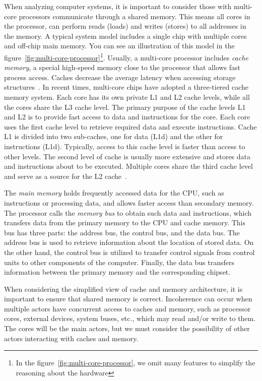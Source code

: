 When analyzing computer systems, it is important to consider those with multi-core processors communicate through a shared memory. This means all cores in the processor, can perform reads (loads) and writes (stores) to all addresses in the memory. A typical system model includes a single chip with multiple cores and off-chip main memory. You can see an illustration of this model in the figure~\ref{fig:multi-core-processor}\footnote{In the figure~\ref{fig:multi-core-processor}, we omit many features to simplify the reasoning about the hardware}. Usually, a multi-core processor includes \emph{cache memory}, a special high-speed memory close to the processor that allows fast process access. Caches decrease the average latency when accessing storage structures~\cite{DBLP_series_synthesis_2020Nagarajan, DBLP_series_synthesis_2013Scott}. In recent times, multi-core chips have adopted a three-tiered cache memory system. Each core has its own private L1 and L2 cache levels, while all the cores share the L3 cache level. The primary purpose of the cache levels L1 and L2 is to provide fast access to data and instructions for the core. Each core uses the first cache level to retrieve required data and execute instructions. Cache L1 is divided into two sub-caches, one for data (L1d) and the other for instructions (L1d). Typically, access to this cache level is faster than access to other levels. The second level of cache is usually more extensive and stores data and instructions about to be executed.
Multiple cores share the third cache level and serve as a source for the L2 cache~\cite{devices_amd64,guideintel}.


The \emph{main memory} holds frequently accessed data for the CPU, such as instructions or processing data, and allows faster access than secondary memory. The processor calls the \emph{memory bus} to obtain such data and instructions, which transfers data from the primary memory to the CPU and cache memory. This bus has three parts: the address bus, the control bus, and the data bus. The address bus is used to retrieve information about the location of stored data.  On the other hand, the control bus is utilized to transfer control signals from control units to other components of the computer. Finally, the data bus transfers information between the primary memory and the corresponding chipset.


When considering the simplified view of cache and memory architecture, it is important to ensure that shared memory is correct. Incoherence can occur when multiple actors have concurrent access to caches and memory, such as processor cores, external devices, system buses, etc., which may read and/or write to them. The cores will be the main actors, but we must consider the possibility of other actors interacting with caches and memory.

